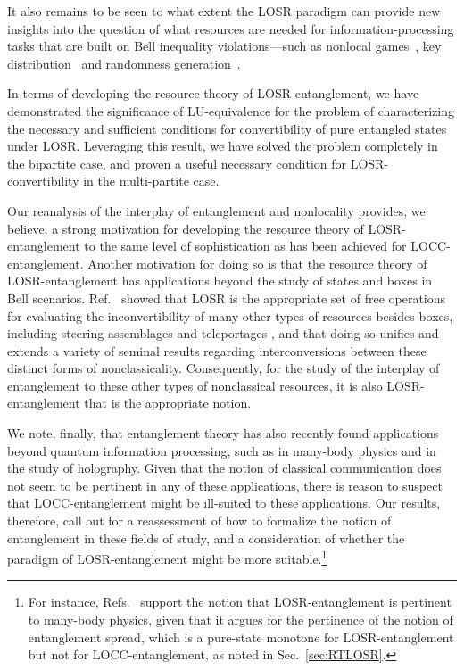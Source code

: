 \documentclass[12pt]{article}
\theoremstyle{plain}
\theoremstyle{definition}
\begin{document}
 It also remains to be seen to what extent the LOSR paradigm can provide
 new insights into the question of what resources are needed for information-processing tasks that are built on Bell inequality violations---such as nonlocal games~\cite{Broadbent2006,Palazuelos2016,Johnston2016}, key distribution~\cite{BHK,Acin2006QKD,Scarani2006QKD,Acin2007QKD,vazirani14,Kaniewski2016chsh} and randomness generation~\cite{Colbeckthesis,colbeckamp,Pironio2010,Dhara2013DIRNG}.


In terms of developing the resource theory of LOSR-entanglement, we have demonstrated the significance of LU-equivalence for the problem of characterizing the necessary and sufficient conditions for convertibility of pure entangled states under LOSR.  Leveraging this result, we have solved the problem completely in the bipartite case, and proven a useful necessary condition for LOSR-convertibility in the multi-partite case. 

 
Our reanalysis of the interplay of entanglement and nonlocality provides, we believe,  a strong motivation for developing the resource theory of LOSR-entanglement to the same level of sophistication as has been achieved for LOCC-entanglement.   Another motivation for doing so is that the resource theory of LOSR-entanglement has  applications beyond the study of states and boxes in Bell scenarios.
    Ref.~\cite{semiquantum} showed that LOSR is the appropriate set of free operations for evaluating the inconvertibility of many other types of resources besides boxes,  including steering assemblages \cite{Einstein1935,Schrodinger1935,wisesteer,Zjawin2023quantifyingepr,Zjawin2023resourcetheoryof} and teleportages \cite{telep, PhysRevA.99.032334,Hoban_2018}, and that doing so
      unifies and extends a variety of seminal results regarding interconversions between these distinct forms of nonclassicality. Consequently, for the study of 
      the interplay of entanglement to 
      these other types of nonclassical resources, it is also LOSR-entanglement that is the appropriate notion.

We note, finally,  that entanglement theory has also recently found applications beyond quantum information processing, such as in many-body physics and in the study of holography.  Given that the notion of classical communication does not seem to be pertinent in any of these applications, there is reason to suspect that LOCC-entanglement might be ill-suited to these applications. 
Our results, therefore, call out for a reassessment of how to formalize the notion of entanglement in these fields of study, 
 and a consideration of whether the paradigm of LOSR-entanglement might be more suitable.\footnote{For instance, Refs.~\cite{Harrow2010,anshu2022entanglement} support the notion that LOSR-entanglement is pertinent to many-body physics, given that it argues for the pertinence of the notion of entanglement spread, which is a 
 pure-state monotone for LOSR-entanglement but not for LOCC-entanglement,
   as noted in Sec.~\ref{sec:RTLOSR}.} 
\end{document}
